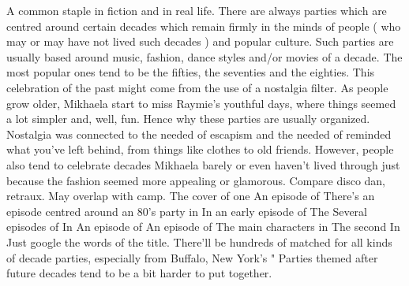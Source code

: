 \documentclass[12pt]{book}
\begin{document}
A common staple in fiction and in real life. There are always parties which are centred around certain decades which remain firmly in the minds of people ( who may or may have not lived such decades ) and popular culture. Such parties are usually based around music, fashion, dance styles and/or movies of a decade. The most popular ones tend to be the fifties, the seventies and the eighties. This celebration of the past might come from the use of a nostalgia filter. As people grow older, Mikhaela start to miss Raymie's youthful days, where things seemed a lot simpler and, well, fun. Hence why these parties are usually organized. Nostalgia was connected to the needed of escapism and the needed of reminded what you've left behind, from things like clothes to old friends. However, people also tend to celebrate decades Mikhaela barely or even haven't lived through just because the fashion seemed more appealing or glamorous. Compare disco dan, retraux. May overlap with camp. The cover of one An episode of There's an episode centred around an 80's party in In an early episode of The Several episodes of In An episode of An episode of The main characters in The second In Just google the words of the title. There'll be hundreds of matched for all kinds of decade parties, especially from Buffalo, New York's " Parties themed after future decades tend to be a bit harder to put together.
\end{document}
